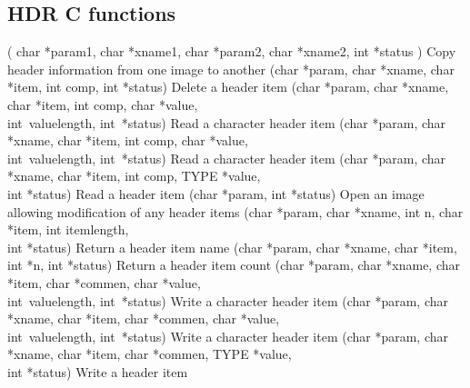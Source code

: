 \documentclass[twoside,11pt]{article}
\newenvironment{latexonly}{}{}
\renewcommand{\_}{\texttt{\symbol{95}}}
\begin{document}
\subsection{HDR C functions}
\begin{latexonly}
{\small
\begin{description}
     {( char *param1, char *xname1, char *param2, char *xname2, int *status )}
     {Copy header information from one image to another}
     {(char *param, char *xname, char *item, int comp, int *status)}
     {Delete a header item}
     {(char *param, char *xname, char *item, int comp, char *value,
       \\ \hspace*{3em} int~value\_length, int~*status)}
     {Read a character header item}
     {(char *param, char *xname, char *item, int comp, char *value,
       \\ \hspace*{3em} int~value\_length, int~*status)}
     {Read a character header item}
     {(char *param, char *xname, char *item, int comp, TYPE *value,
       \\ \hspace*{3em} int *status)}
     {Read a header item}
     {(char *param, int *status)}
     {Open an image allowing modification of any header items}
     {(char *param, char *xname, int n, char *item, int item\_length,
       \\ \hspace*{3em} int *status)}
     {Return a header item name}
     {(char *param, char *xname, char *item, int *n, int *status)}
     {Return a header item count}
     {(char *param, char *xname, char *item, char *commen,
       char *value, \\ \hspace*{3em} int~value\_length, int~*status)}
     {Write a character header item}
     {(char *param, char *xname, char *item, char *commen,
       char *value, \\ \hspace*{3em} int~value\_length, int~*status)}
     {Write a character header item}
     {(char *param, char *xname, char *item, char *commen,
       TYPE *value, \\ \hspace*{3em} int *status)}
     {Write a header item}
\end{description}
}
\end{latexonly}
\end{document}
